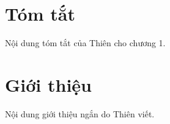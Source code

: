 \section{Tóm tắt}
Nội dung tóm tắt của Thiên cho chương 1.

\section{Giới thiệu}
Nội dung giới thiệu ngắn do Thiên viết.
